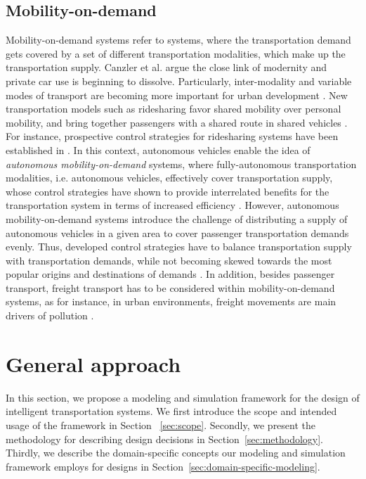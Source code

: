 \documentclass[a4paper,twoside]{article}
\begin{document}
	\subsection{Mobility-on-demand}
\label{sec:mobility-on-demand-systems}
	Mobility-on-demand systems refer to systems, where the transportation demand gets covered by a set of different transportation modalities, which make up the transportation supply.
	Canzler et al. \cite{canzler2016mobility} argue the close link of modernity and private car use is beginning to dissolve. Particularly, inter-modality and variable modes of transport are becoming more important for urban development \cite{rode2015towards}. New transportation models such as ridesharing favor shared mobility over personal mobility, and bring together passengers with a shared route in shared vehicles \cite{cohen2014ride}. For instance, prospective control strategies for ridesharing systems have been established in \cite{furuhata2013ridesharing,agatz2012optimization}.
	 In this context, autonomous vehicles enable the idea of \textit{autonomous mobility-on-demand} systems, where fully-autonomous transportation modalities, i.e. autonomous vehicles, effectively cover transportation supply, whose control strategies have shown to provide interrelated benefits for the transportation system in terms of increased efficiency \cite{fagnant2014travel}. However, autonomous mobility-on-demand systems introduce the challenge of distributing a supply of autonomous vehicles in a given area to cover passenger transportation demands evenly. Thus, developed control strategies have to balance transportation supply with transportation demands, while not becoming skewed towards the most popular origins and destinations of demands \cite{pavone2012robotic,zhang2016control}. In addition, besides passenger transport, freight transport has to be considered within mobility-on-demand systems, as for instance, in urban environments, freight movements are main drivers of pollution  \cite{amaral2015city}. %
	
	\section{General approach}
	\label{sec:approach}
	
	In this section, we propose a modeling and simulation framework for the design of intelligent transportation systems.
	We first introduce the scope and intended usage of the framework in Section ~\ref{sec:scope}.
	Secondly, we present the methodology for describing design decisions in Section~\ref{sec:methodology}.
	Thirdly, we describe the domain-specific concepts our modeling and simulation framework employs for designs in Section~\ref{sec:domain-specific-modeling}.
	
\end{document}
